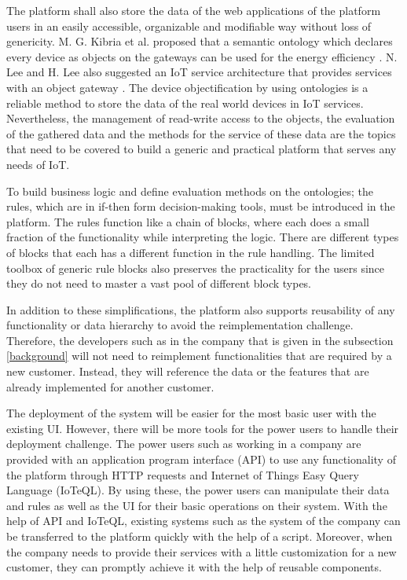 The platform shall also store the data of the web applications of the platform users in an easily accessible, organizable and modifiable way without loss of genericity. M. G. Kibria et al. proposed that a semantic ontology which declares every device as objects on the gateways can be used for the energy efficiency \cite{7993747}. N. Lee and H. Lee also suggested an IoT service architecture that provides services with an object gateway \cite{6884496}. The device objectification by using ontologies is a reliable method to store the data of the real world devices in IoT services. Nevertheless, the management of read-write access to the objects, the evaluation of the gathered data and the methods for the service of these data are the topics that need to be covered to build a generic and practical platform that serves any needs of IoT.

To build business logic and define evaluation methods on the ontologies; the rules, which are in if-then form decision-making tools, must be introduced in the platform. The rules function like a chain of blocks, where each does a small fraction of the functionality while interpreting the logic.  There are different types of blocks that each has a different function in the rule handling. The limited toolbox of generic rule blocks also preserves the practicality for the users since they do not need to master a vast pool of different block types.

In addition to these simplifications, the platform also supports reusability of any functionality or data hierarchy to avoid the reimplementation challenge. Therefore, the developers such as in the company that is given in the subsection \ref{background} will not need to reimplement functionalities that are required by a new customer. Instead, they will reference the data or the features that are already implemented for another customer.


The deployment of the system will be easier for the most basic user with the existing UI. However, there will be more tools for the power users to handle their deployment challenge. The power users such as working in a company are provided with an application program interface (API) to use any functionality of the platform through HTTP requests and Internet of Things Easy Query Language (IoTeQL). By using these, the power users can manipulate their data and rules as well as the UI for their basic operations on their system. With the help of API and IoTeQL, existing systems such as the system of the company can be transferred to the platform quickly with the help of a script. Moreover, when the company needs to provide their services with a little customization for a new customer, they can promptly achieve it with the help of reusable components.

